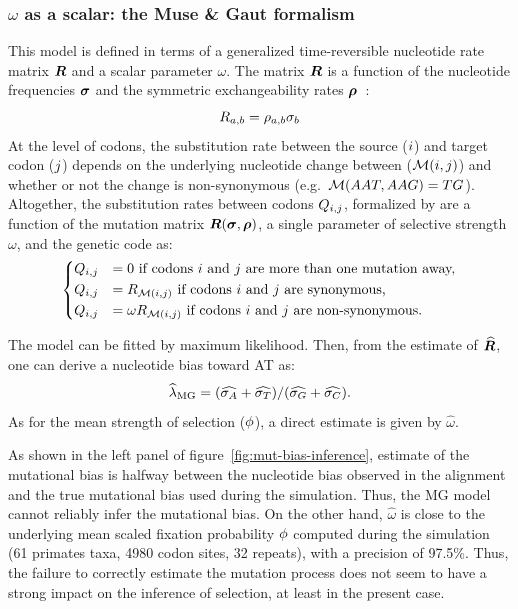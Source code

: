 \documentclass{article}
\begin{document}
\subsubsection{\texorpdfstring{$\omega$}{ω} as a scalar: the Muse \& Gaut formalism}
This model is defined in terms of a generalized time-reversible nucleotide rate matrix $\bm{R}$ and a scalar parameter $\omega$.
The matrix $\bm{R}$ is a function of the nucleotide frequencies $\bm{\sigma}$ and the symmetric exchangeability rates $\bm{\rho}$~\citep{Tavare1986}:
\begin{equation}
 R_{a, b} = \rho_{a,b}\sigma_b
\end{equation}
At the level of codons, the {substitution} rate between the source (${i}$) and target codon (${j}$) depends on the underlying nucleotide change between ($\mathcal{M}({i}, {j})$) and whether or not the change is {non-synonymous} (e.g.~$\mathcal{M}(AAT, AAG) = TG$).
Altogether, the {substitution} rates between codons $Q_{{i}, {j}}$, formalized by \citet{Muse1994} are a function of the mutation matrix $\bm{R}(\bm{\sigma}, \bm{\rho})$, a single parameter of selective strength $\omega$, and the genetic code as:
\begin{equation}
 \begin{dcases}
 Q_{{i}, {j}} & = 0 \text{ if codons ${i}$ and ${j}$ are more than one mutation away,} \\
 Q_{{i}, {j}} & = R_{\mathcal{M}({i}, {j})} \text{ if codons ${i}$ and ${j}$ are {synonymous},} \\
 Q_{{i}, {j}} & = \omega R_{\mathcal{M}({i}, {j})} \text{ if codons ${i}$ and ${j}$ are non-synonymous}.
 \end{dcases}
 \label{eq:codon-muse-gaut}
\end{equation}

The model can be fitted by maximum {likelihood}.
Then, from the estimate of $\widehat{\bm{R}}$, one can derive a nucleotide bias toward AT as:
\begin{equation}
 \widehat{\lambda}_{\text{{MG}}} = (\widehat{\sigma_A} +\widehat{\sigma_T}) /(\widehat{\sigma_G} +\widehat{\sigma_C}).\label{eq:lambda-R}
\end{equation}
As for the mean strength of selection ($\phi$), a direct estimate is given by $\widehat{\omega}$.

As shown in the left panel of figure~\ref{fig:mut-bias-inference}, estimate of the mutational bias is halfway between the nucleotide bias observed in the alignment and the true mutational bias used during the simulation.
Thus, the {MG} model cannot reliably infer the mutational bias.
On the other hand, $\widehat{\omega}$ is close to the underlying mean scaled fixation probability $\phi$ computed during the simulation (61 primates taxa, 4980 codon sites, 32 repeats), with a precision of 97.5\%.
Thus, the failure to correctly estimate the mutation process does not seem to have a strong impact on the inference of selection, at least in the present case.
\end{document}

